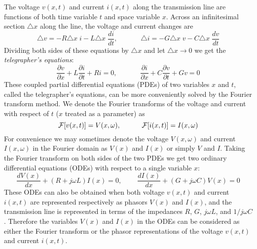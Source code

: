 The voltage $v(x,t)$ and current $i(x,t)$ along the transmission line are 
functions of both time variable $t$ and space variable $x$. Across an
infinitesimal section $\triangle x$ along the line, the voltage and current
changes are
\[ \triangle v=-R\triangle x\; i-L\triangle x \;\frac{di}{dt},
\;\;\;\;\;\;\;\;\;\;\;\;
\triangle i=-G\triangle x\; v-C\triangle x\; \frac{dv}{dt} \]
Dividing both sides of these equations by $\triangle x$ and let 
$\triangle x\rightarrow 0$ we get the {\em telegrapher's equations}:
\[
\frac{\partial v}{\partial x}+L \frac{\partial i}{\partial t}+Ri=0,
\;\;\;\;\;\;\;\;\;\;\;\;
\frac{\partial i}{\partial x}+C \frac{\partial v}{\partial t}+Gv=0
\]
These coupled partial differential equations (PDEs) of two variables $x$ and 
$t$, called the telegrapher's equations, can be more conveniently solved by 
the Fourier transform method. We denote the Fourier transforms of the voltage
and current with respect of $t$ ($x$ treated as a parameter) as
\[ {\cal F}[v(x,t)]=V(x,\omega),\;\;\;\;\;\;\;\;\;\;\;{\cal F}[i(x,t)]=I(x,\omega) \]
For convenience we may sometimes denote the voltage $V(x,\omega)$ and current 
$I(x,\omega)$ in the Fourier domain as $V(x)$ and $I(x)$ or simply $V$ and $I$.
Taking the Fourier transform on both sides of the two PDEs we get two ordinary 
differential equations (ODEs) with respect to a single variable $x$:
\[
\frac{dV(x)}{dx}+(R+j\omega L)I(x)=0,
\;\;\;\;\;\;\;\;\frac{dI(x)}{dx}+(G+j\omega C)V(x)=0 
\]
These ODEs can also be obtained when both voltage $v(x,t)$ and current $i(x,t)$ 
are represented respectively as phasors $V(x)$ and $I(x)$, and the transmission 
line is represented in terms of the impedances $R$, $G$, $j\omega L$, and 
$1/j\omega C$. Therefore the variables $V(x)$ and $I(x)$ in the ODEs can be 
considered as either the Fourier transform or the phasor representations of 
the voltage $v(x,t)$ and current $i(x,t)$.

